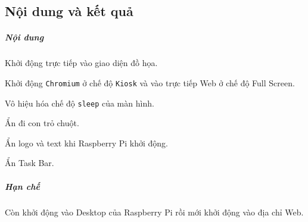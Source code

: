 \documentclass[12pt,a4paper]{article}
\begin{document}
\subsection{Nội dung và kết quả}
\subparagraph{Nội dung}
	\begin{list}{--}{}
		\item Khởi động trực tiếp vào giao diện đồ họa.
		
		\item Khởi động \verb|Chromium| ở chế độ \verb|Kiosk| và vào trực tiếp Web ở chế độ Full Screen.
		
		\item Vô hiệu hóa chế độ \verb|sleep| của màn hình.
		
		\item Ẩn đi con trỏ chuột.
		
		\item Ẩn logo và text khi Raspberry Pi khởi động.
		
		\item Ẩn Task Bar.
	\end{list}

\subparagraph{Hạn chế}Còn khởi động vào Desktop của Raspberry Pi rồi mới khởi động vào địa chỉ Web.
\end{document}
